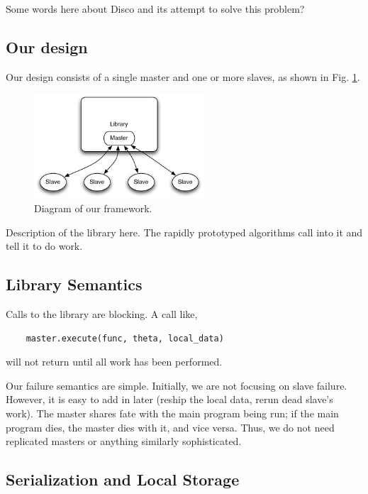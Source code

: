 \documentclass[%
        final,
        notitlepage,
        narroweqnarray,
        inline,
        ]{ieee}
\begin{document}
Some words here about Disco and its attempt to solve this problem?

\subsection{Our design}

Our design consists of a single master and one or more slaves, as shown in
Fig. \ref{diagram}.

\begin{figure}[hb]
  \begin{center}
    \includegraphics[width=2.5in]{fwk_diagram/fwk_diagram.pdf}
  \end{center}
  \caption{Diagram of our framework.}
  \label{diagram}
\end{figure}

Description of the library here. The rapidly prototyped algorithms call into it
and tell it to do work.

\subsection{Library Semantics}

Calls to the library are blocking. A call like,

\begin{verbatim}
    master.execute(func, theta, local_data)
\end{verbatim}

will not return until all work has been performed.

Our failure semantics are simple. Initially, we are not focusing on slave
failure. However, it is easy to add in later (reship the local data, rerun dead
slave's work). The master shares fate with the main program being run; if the
main program dies, the master dies with it, and vice versa. Thus, we do not
need replicated masters or anything similarly sophisticated.

\subsection{Serialization and Local Storage}
\end{document}
